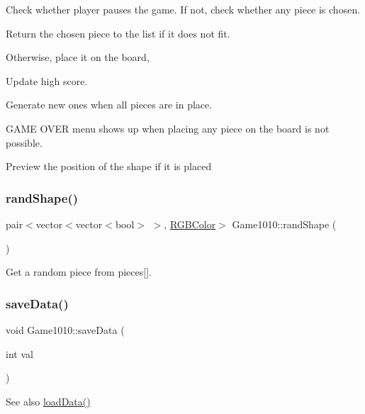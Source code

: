Check whether player pauses the game. If not, check whether any piece is chosen.

Return the chosen piece to the list if it does not fit.

Otherwise, place it on the board,

Update high score.

Generate new ones when all pieces are in place.

G\+A\+ME O\+V\+ER menu shows up when placing any piece on the board is not possible.

Preview the position of the shape if it is placed \mbox{\label{class_game1010_a9b86f7bf4ad3af111014ad33a781ffe5}} 
\subsubsection{\texorpdfstring{rand\+Shape()}{randShape()}}
{\footnotesize\ttfamily pair$<$vector$<$vector$<$bool$>$ $>$, \mbox{\hyperlink{class_r_g_b_color}{R\+G\+B\+Color}}$>$ Game1010\+::rand\+Shape (\begin{DoxyParamCaption}{ }\end{DoxyParamCaption})\hspace{0.3cm}{\ttfamily [inline]}}



Get a random piece from pieces\mbox{[}\mbox{]}. 

\mbox{\label{class_game1010_a72900d1043c4d40f953c584a9d9cb6c8}} 
\subsubsection{\texorpdfstring{save\+Data()}{saveData()}}
{\footnotesize\ttfamily void Game1010\+::save\+Data (\begin{DoxyParamCaption}\item[{int}]{val }\end{DoxyParamCaption})\hspace{0.3cm}{\ttfamily [inline]}}

\begin{DoxySeeAlso}{See also}
\mbox{\hyperlink{class_game1010_a3dbbf957de5309f1e7f3d6008f948176}{load\+Data()}} 
\end{DoxySeeAlso}
\mbox{\label{class_game1010_a99d6f53c3073861fe37ef67caa073840}} 
